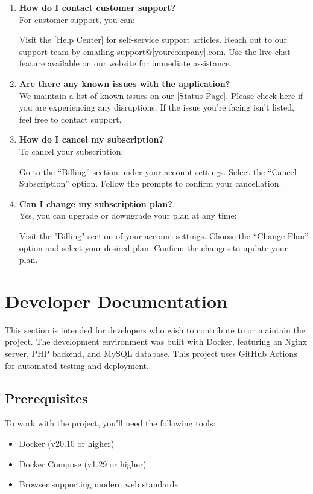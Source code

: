 \documentclass[12pt,a4paper]{report}
\begin{document}
\begin{enumerate}
    \item \textbf{How do I contact customer support?} \\
For customer support, you can:

Visit the [Help Center] for self-service support articles.
Reach out to our support team by emailing support@[yourcompany].com.
Use the live chat feature available on our website for immediate assistance.

    \item \textbf{Are there any known issues with the application?} \\
We maintain a list of known issues on our [Status Page]. Please check here if you are experiencing any disruptions. If the issue you’re facing isn’t listed, feel free to contact support.

    \item \textbf{How do I cancel my subscription?} \\
To cancel your subscription:

Go to the “Billing” section under your account settings.
Select the “Cancel Subscription” option.
Follow the prompts to confirm your cancellation.

    \item \textbf{Can I change my subscription plan?} \\
Yes, you can upgrade or downgrade your plan at any time:

Visit the "Billing" section of your account settings.
Choose the “Change Plan” option and select your desired plan.
Confirm the changes to update your plan.

\end{enumerate}




\chapter{Developer Documentation}
This section is intended for developers who wish to contribute to or maintain the project. The development environment was built with Docker, featuring an Nginx server, PHP backend, and MySQL database. This project uses GitHub Actions for automated testing and deployment.

\section{Prerequisites}
To work with the project, you’ll need the following tools:
\begin{itemize}
    \item Docker (v20.10 or higher)
    \item Docker Compose (v1.29 or higher)
    \item Browser supporting modern web standards
\end{itemize}
\end{document}
